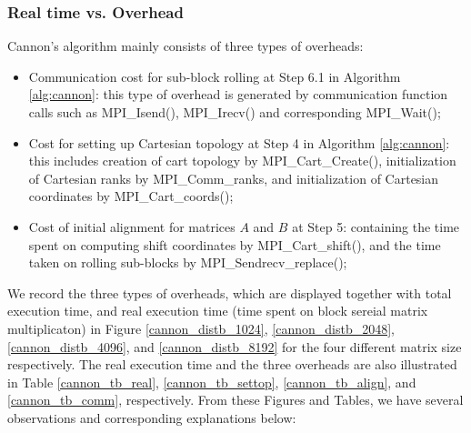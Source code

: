 \documentclass[conference]{IEEEtran}
\begin{document}
\subsubsection{Real time vs. Overhead}
Cannon's algorithm mainly consists of three types of overheads:
\begin{itemize}
    \item Communication cost for sub-block rolling at Step 6.1 in Algorithm \ref{alg:cannon}: this type of overhead is generated by communication function calls such as MPI\_Isend(), MPI\_Irecv() and corresponding MPI\_Wait();
    \item Cost for setting up Cartesian topology at Step 4 in Algorithm \ref{alg:cannon}: this includes creation of cart topology by MPI\_Cart\_Create(), initialization of Cartesian ranks by MPI\_Comm\_ranks, and initialization of Cartesian coordinates by MPI\_Cart\_coords();
    \item Cost of initial alignment for matrices $A$ and $B$ at Step 5: containing the time spent on computing shift coordinates by MPI\_Cart\_shift(), and the time taken on rolling sub-blocks by MPI\_Sendrecv\_replace(); 
\end{itemize}
We record the three types of overheads, which are displayed together with total execution time, and real execution time (time spent on block sereial matrix multiplicaton) in Figure \ref{cannon_distb_1024}, \ref{cannon_distb_2048}, \ref{cannon_distb_4096}, and \ref{cannon_distb_8192} for the four different matrix size respectively. The real execution time and the three overheads are also illustrated in Table \ref{cannon_tb_real}, \ref{cannon_tb_settop}, \ref{cannon_tb_align}, and \ref{cannon_tb_comm}, respectively. From these Figures and Tables, we have several observations and corresponding explanations below:
\end{document}
